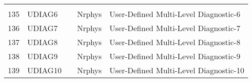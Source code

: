 \begin{tabular}{lllll}
\begin{minipage}[t]{3in}
         \end{minipage}\\
135& UDIAG6   &             &    Nrphys  
         &\begin{minipage}[t]{3in}
          {User-Defined Multi-Level Diagnostic-6} 
         \end{minipage}\\
136& UDIAG7   &             &    Nrphys  
         &\begin{minipage}[t]{3in}
          {User-Defined Multi-Level Diagnostic-7} 
         \end{minipage}\\
137& UDIAG8   &             &    Nrphys  
         &\begin{minipage}[t]{3in}
          {User-Defined Multi-Level Diagnostic-8} 
         \end{minipage}\\
138& UDIAG9   &             &    Nrphys  
         &\begin{minipage}[t]{3in}
          {User-Defined Multi-Level Diagnostic-9} 
         \end{minipage}\\
139& UDIAG10  &             &    Nrphys  
         &\begin{minipage}[t]{3in}
          {User-Defined Multi-Level Diagnostic-10} 
         \end{minipage}\\
\end{tabular}
\vspace{1.5in}
\vfill

